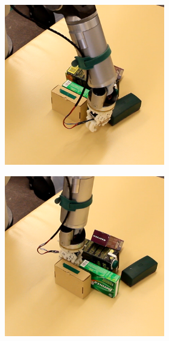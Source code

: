 \begin{figure}
\begin{subfigure}[t]{\textwidth}
\begin{subfigure}[t]{0.195\textwidth}
\end{subfigure}
\begin{subfigure}[t]{0.195\textwidth}
\centering 
\includegraphics[width=\textwidth]{Img/experiments/exp_good/action3c.png}
\end{subfigure}
\begin{subfigure}[t]{0.195\textwidth}
\centering 
\includegraphics[width=\textwidth]{Img/experiments/exp_good/action4c.png}

\end{subfigure}
\end{subfigure}
\end{figure}
